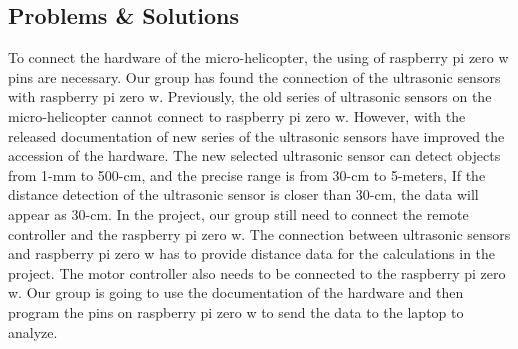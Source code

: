 \documentclass[onecolumn, draftclsnofoot,10pt, compsoc]{IEEEtran}
\begin{document}
\subsection{Problems \& Solutions}
To connect the hardware of the micro-helicopter, the using of raspberry pi zero w pins are necessary. Our group has found the connection of the ultrasonic sensors with raspberry pi zero w. Previously, the old series of ultrasonic sensors on the micro-helicopter cannot connect to raspberry pi zero w. However, with the released documentation of new series of the ultrasonic sensors have improved the accession of the hardware. The new selected ultrasonic sensor can detect objects from 1-mm to 500-cm, and the precise range is from 30-cm to 5-meters, If the distance detection of the ultrasonic sensor is closer than 30-cm, the data will appear as 30-cm.
In the project, our group still need to connect the remote controller and the raspberry pi zero w. The connection between ultrasonic sensors and raspberry pi zero w has to provide distance data for the calculations in the project. The motor controller also needs to be connected to the raspberry pi zero w. Our group is going to use the documentation of the hardware and then program the pins on raspberry pi zero w to send the data to the laptop to analyze.
\end{document}

